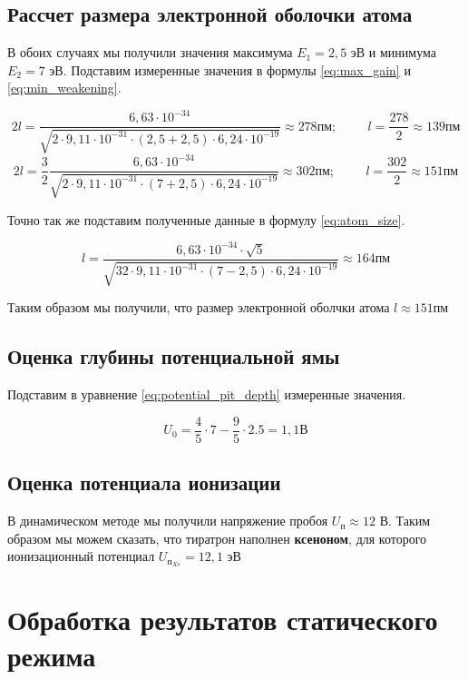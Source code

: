 \documentclass[12pt]{article}
\begin{document}
    \subsection{Рассчет размера электронной оболочки атома}

      В обоих случаях мы получили значения максимума $E_1 = 2,5$ эВ и минимума $E_2 = 7$ эВ.
      Подставим измеренные значения в формулы \ref{eq:max_gain} и \ref{eq:min_weakening}.

      $$
        2 l = \frac{6,63 \cdot 10^{-34}}{\sqrt{2 \cdot 9,11 \cdot 10^{-31} \cdot \left( 2,5 + 2,5 \right) \cdot 6,24 \cdot 10^{-19}}} \approx 278 пм; \hspace{1cm}
        l = \frac{278}{2} \approx 139 пм
      $$
      $$
        2 l = \frac{3}{2} \frac{6,63 \cdot 10^{-34}}{\sqrt{2 \cdot 9,11 \cdot 10^{-31} \cdot \left( 7 + 2,5 \right) \cdot 6,24 \cdot 10^{-19}}} \approx 302 пм; \hspace{1cm}
        l = \frac{302}{2} \approx 151 пм
      $$

      Точно так же подставим полученные данные в формулу \ref{eq:atom_size}.

      $$
        l = \frac{6,63 \cdot 10^{-34} \cdot \sqrt{5}}{\sqrt{32 \cdot 9,11 \cdot 10^{-31} \cdot \left( 7 - 2,5 \right) \cdot 6,24 \cdot 10^{-19}}} \approx 164 пм
      $$

      Таким образом мы получили, что размер электронной оболчки атома $l \approx 151 пм$

    \subsection{Оценка глубины потенциальной ямы}

      Подставим в уравнение \ref{eq:potential_pit_depth} измеренные значения.

      $$
        U_0 = \frac{4}{5} \cdot 7 - \frac{9}{5} \cdot 2.5 = 1,1 В
      $$

    \subsection{Оценка потенциала ионизации}

      В динамическом методе мы получили напряжение пробоя $U_п \approx 12$ В.
      Таким образом мы можем сказать, что тиратрон наполнен \textbf{ксеноном}, для которого
      ионизационный потенциал $U_{п_{Xe}} = 12,1$ эВ

  \section{Обработка результатов статического режима}
\end{document}
